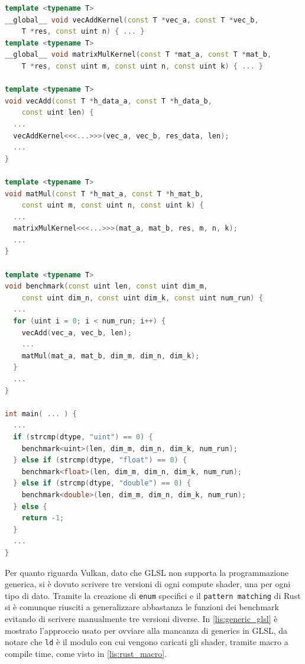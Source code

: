 \vspace{5mm}
\begin{lstlisting}[language=C++, caption=Programmazione generica in CUDA, label=lis:generic_cuda]
template <typename T>
__global__ void vecAddKernel(const T *vec_a, const T *vec_b, 
    T *res, const uint n) { ... }
template <typename T>
__global__ void matrixMulKernel(const T *mat_a, const T *mat_b, 
    T *res, const uint m, const uint n, const uint k) { ... }

template <typename T>
void vecAdd(const T *h_data_a, const T *h_data_b, 
    const uint len) { 
  ...
  vecAddKernel<<<...>>>(vec_a, vec_b, res_data, len);
  ...
}

template <typename T>
void matMul(const T *h_mat_a, const T *h_mat_b, 
    const uint m, const uint n, const uint k) { 
  ... 
  matrixMulKernel<<<...>>>(mat_a, mat_b, res, m, n, k);
  ...
}

template <typename T>
void benchmark(const uint len, const uint dim_m, 
    const uint dim_n, const uint dim_k, const uint num_run) {
  ...
  for (uint i = 0; i < num_run; i++) {
    vecAdd(vec_a, vec_b, len);
    ...
    matMul(mat_a, mat_b, dim_m, dim_n, dim_k);
  }
  ...
}

int main( ... ) {
  ...
  if (strcmp(dtype, "uint") == 0) {
    benchmark<uint>(len, dim_m, dim_n, dim_k, num_run);
  } else if (strcmp(dtype, "float") == 0) {
    benchmark<float>(len, dim_m, dim_n, dim_k, num_run);
  } else if (strcmp(dtype, "double") == 0) {
    benchmark<double>(len, dim_m, dim_n, dim_k, num_run);
  } else {
    return -1;
  }
  ...
}
\end{lstlisting}
\vspace{5mm}

Per quanto riguarda Vulkan, dato che GLSL non supporta la programmazione generica, si è dovuto scrivere tre versioni di ogni compute shader, una per ogni tipo di dato. Tramite la creazione di \verb|enum| specifici e il \verb|pattern matching| di Rust si è comunque riusciti a generalizzare abbastanza le funzioni dei benchmark evitando di scrivere manualmente tre versioni diverse. In \ref{lis:generic_glsl} è mostrato l'approccio usato per ovviare alla mancanza di generics in GLSL, da notare che \verb|ld| è il modulo con cui vengono caricati gli shader, tramite macro a compile time, come visto in \ref{lis:rust_macro}.

